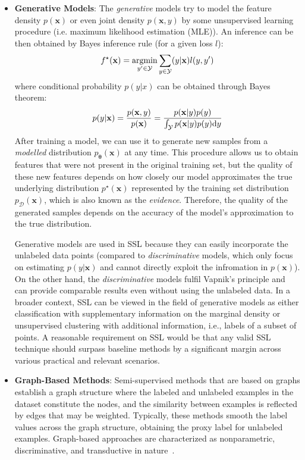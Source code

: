 \begin{itemize}
        \item \textbf{Generative Models}:\label{generative-modelling} The \textit{generative} models try to model the feature density $p(\mathbf{x})$ or even joint density 
        $p(\mathbf{x},y)$ by some unsupervised learning procedure (i.e. maximum likelihood estimation (MLE)). An inference can be then obtained by Bayes 
        inference rule (for a given loss $l$):
        \begin{equation*}
            f^{\star}(\mathbf{x}) = \mathop{\rm argmin}_{y^\prime\in \mathcal{Y}} \sum_{y \in \mathcal{Y}}(y|\mathbf{x})l(y,y^\prime)
        \end{equation*}
        where conditional probability $p(y|x)$ can be obtained through Bayes theorem:
        \begin{equation*}
            p(y|\mathbf{x}) = \frac{p(\mathbf{x},y)}{p(\mathbf{x})} =\frac{p(\mathbf{x}|y)p(y)}{\int_\mathcal{Y} p(\mathbf{x}|y)p(y) \mbox{\rm d}y}
        \end{equation*}
        After training a model, we can use it to generate new samples from a \textit{modelled} distribution $p_\mathbf{\theta}(\mathbf{x})$ at any time. 
        This procedure allows us to obtain features that were not present in the original training set, but the quality of these new features depends on
        how closely our model approximates the true underlying distribution $p^\star(\mathbf{x})$ represented by the training set distribution 
        $p_{\mathcal{D}}(\mathbf{x})$, which is also known as the \textit{evidence}. Therefore, the quality of the generated samples depends on the 
        accuracy of the model's approximation to the true distribution.

        Generative models are used in SSL because they can easily incorporate the unlabeled data points (compared to \textit{discriminative} models, which only focus on estimating
        $p(y|\mathbf{x})$ and cannot directly exploit the infromation in $p(\mathbf{x})$). On the other hand, the \textit{discriminative} models fulfil Vapnik's principle and can provide comparable results even without using the unlabeled data. In a broader context, SSL can be viewed in the field of generative models as 
        either classification with supplementary information on the marginal density or unsupervised clustering with additional information, i.e., labels of a subset 
        of points. A reasonable requirement on SSL would be that any valid SSL technique should surpass baseline methods by a significant margin across various practical and relevant scenarios.
    
    \item \textbf{Graph-Based Methods}:
    Semi-supervised methods that are based on graphs establish a graph structure where the labeled and unlabeled examples in the dataset constitute the nodes, and the 
    similarity between examples is reflected by edges that may be weighted. Typically, these methods smooth the label values across the graph structure, obtaining the proxy label for unlabeled examples. Graph-based 
    approaches are characterized as nonparametric, discriminative, and transductive in nature~\cite{another-survey-2008}.
\end{itemize}

